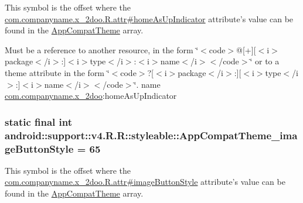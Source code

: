 This symbol is the offset where the \hyperlink{classcom_1_1companyname_1_1x__2doo_1_1_r_1_1attr_f60b6d313356916d6f1f95bacce2873a}{com.companyname.x\_\-2doo.R.attr\#homeAsUpIndicator} attribute's value can be found in the \hyperlink{classandroid_1_1support_1_1v4_1_1_r_1_1styleable_0873e92ba21076bb5a4aeadeb7f5779f}{AppCompatTheme} array.

Must be a reference to another resource, in the form \char`\"{}$<$code$>$@\mbox{[}+\mbox{]}\mbox{[}$<$i$>$package$<$/i$>$:\mbox{]}$<$i$>$type$<$/i$>$:$<$i$>$name$<$/i$>$$<$/code$>$\char`\"{} or to a theme attribute in the form \char`\"{}$<$code$>$?\mbox{[}$<$i$>$package$<$/i$>$:\mbox{]}\mbox{[}$<$i$>$type$<$/i$>$:\mbox{]}$<$i$>$name$<$/i$>$$<$/code$>$\char`\"{}.  name \hyperlink{namespacecom_1_1companyname_1_1x__2doo}{com.companyname.x\_\-2doo}:homeAsUpIndicator \hypertarget{classandroid_1_1support_1_1v4_1_1_r_1_1styleable_55a07b8f677eb6c8883891c1f2cfcf74}{
\subsubsection[{AppCompatTheme\_\-imageButtonStyle}]{\setlength{\rightskip}{0pt plus 5cm}static final int android::support::v4.R.R::styleable::AppCompatTheme\_\-imageButtonStyle = 65}}
\label{classandroid_1_1support_1_1v4_1_1_r_1_1styleable_55a07b8f677eb6c8883891c1f2cfcf74}


This symbol is the offset where the \hyperlink{classcom_1_1companyname_1_1x__2doo_1_1_r_1_1attr_9a07b613541a06f3397f8ce0360b5bb9}{com.companyname.x\_\-2doo.R.attr\#imageButtonStyle} attribute's value can be found in the \hyperlink{classandroid_1_1support_1_1v4_1_1_r_1_1styleable_0873e92ba21076bb5a4aeadeb7f5779f}{AppCompatTheme} array.

